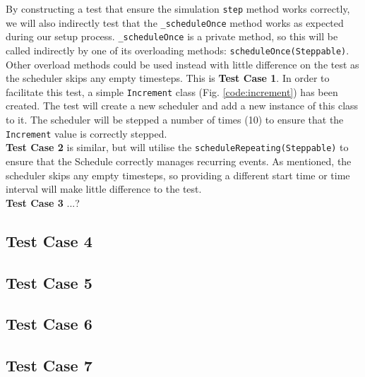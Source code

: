\documentclass[11pt]{article}
\begin{document}
By constructing a test that ensure the simulation \texttt{step} method works correctly, we will also indirectly test that the \texttt{\_scheduleOnce} method works as expected during our setup process.
\texttt{\_scheduleOnce} is a private method, so this will be called indirectly by one of its overloading methods: \texttt{scheduleOnce(Steppable)}.
Other overload methods could be used instead with little difference on the test as the scheduler skips any empty timesteps.
This is \textbf{Test Case 1}.
In order to facilitate this test, a simple \texttt{Increment} class (Fig. \ref{code:increment}) has been created.
The test will create a new scheduler and add a new instance of this class to it.
The scheduler will be stepped a number of times (10) to ensure that the \texttt{Increment} value is correctly stepped.
\\

\textbf{Test Case 2} is similar, but will utilise the \texttt{scheduleRepeating(Steppable)} to ensure that the Schedule correctly manages recurring events. As mentioned, the scheduler skips any empty timesteps, so providing a different start time or time interval will make little difference to the test.
\\

\textbf{Test Case 3} ...?
\\


\subsection{Test Case 4}
\subsection{Test Case 5}
\subsection{Test Case 6}
\subsection{Test Case 7}
\end{document}
